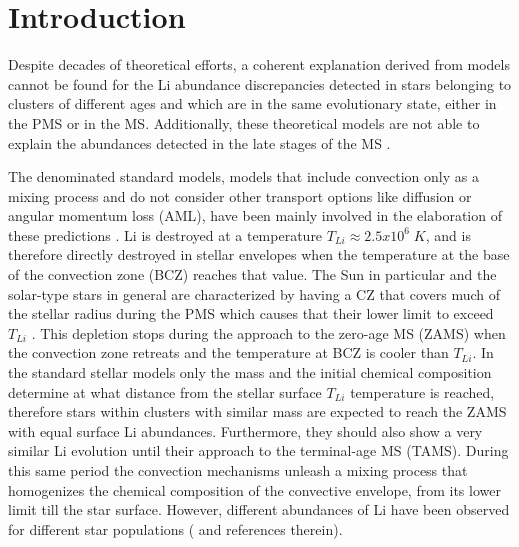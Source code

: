 \documentclass[fleqn,usenatbib]{mnras}
\begin{document}

\section{Introduction} \label{sec_1}
Despite decades of theoretical efforts, a coherent explanation derived from models cannot be found for the Li abundance discrepancies detected in stars belonging to clusters of different ages and which are in the same evolutionary state, either in the PMS or in the MS. Additionally, these theoretical models are not able to explain the abundances detected in the late stages of the MS \citep{Tschape2001}.\par

The denominated standard models, models that include convection only as a mixing process and do not consider other transport options like diffusion or angular momentum loss (AML), have been mainly involved in the elaboration of these predictions \citep{Sestito2005}. Li is destroyed at a temperature $T_{Li} \approx 2.5 x 10^6\; K$, and is therefore directly destroyed in stellar envelopes when the temperature at the base of the convection zone (BCZ) reaches that value. The Sun in particular and the solar-type stars in general are characterized by having a CZ that covers much of the stellar radius during the PMS which causes that their lower limit to exceed $T_{Li}$ \citep{Iben1965}. This depletion stops during the approach to the zero-age MS (ZAMS) when the convection zone retreats and the temperature at BCZ is cooler than $T_{Li}$. In the standard stellar models only the mass and the initial chemical composition determine at what distance from the stellar surface $T_{Li}$ temperature is reached, therefore stars within clusters with similar mass are expected to reach the ZAMS with equal surface Li abundances. Furthermore, they should also show a very similar Li evolution until their approach to the terminal-age MS (TAMS). During this same period the convection mechanisms unleash a mixing process that homogenizes the chemical composition of the convective envelope, from its lower limit till the star surface. However, different abundances of Li have been observed for different star populations (\citet{Somers2014} and references therein).\par
\end{document}
